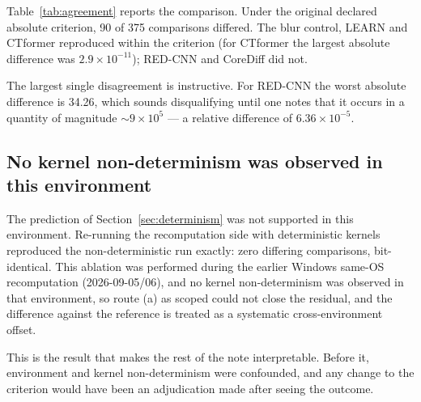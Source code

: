 \documentclass[11pt]{article}
\begin{document}
Table~\ref{tab:agreement} reports the comparison. Under the original declared absolute criterion, 90
of 375 comparisons differed. The blur control, LEARN and CTformer reproduced within the criterion
(for CTformer the largest absolute difference was $2.9\times10^{-11}$); RED-CNN and CoreDiff did
not.

\begin{table}[ht]
\centering

\caption{\textbf{Agreement by method.} $n_{\ne}$ counts comparisons differing at all under the
original declared absolute $10^{-6}$ criterion. The worst relative difference and its metric are given
for each method; the final column counts comparisons outside the declared per-metric relative
criterion of $10^{-4}$, which is zero everywhere. That three methods reproduce exactly, together with
the route-(a) rerun of Section~\ref{sec:determinism}, shows that the pipeline, data and code
snapshot are capable of bit-identical reproduction under this configuration; in that earlier
Windows environment the differences in the other two were not observed to depend on kernel
non-determinism.}
\label{tab:agreement}
\end{table}

The largest single disagreement is instructive. For RED-CNN the worst absolute difference is 34.26,
which sounds disqualifying until one notes that it occurs in a quantity of magnitude
$\sim9\times10^{5}$ --- a relative difference of $6.36\times10^{-5}$.

\subsection{No kernel non-determinism was observed in this environment}

The prediction of Section~\ref{sec:determinism} was not supported in this environment. Re-running
the recomputation side with deterministic kernels reproduced the non-deterministic run exactly:
zero differing comparisons, bit-identical. This ablation was performed during the earlier Windows
same-OS recomputation (2026-09-05/06), and no kernel non-determinism was observed in that
environment, so route (a) as scoped could not close the residual, and the difference against the
reference is treated as a systematic cross-environment offset.

This is the result that makes the rest of the note interpretable. Before it, environment and kernel
non-determinism were confounded, and any change to the criterion would have been an adjudication
made after seeing the outcome.
\end{document}
